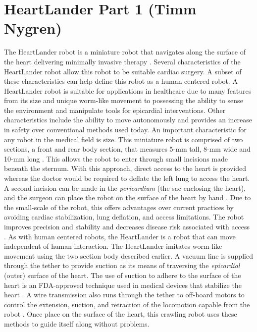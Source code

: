 \documentclass[11pt,conference]{IEEEtran}
\begin{document}
\section{ HeartLander Part 1 (Timm Nygren)}

\indent The HeartLander robot is a miniature robot that navigates along the surface of the heart delivering minimally invasive therapy \cite{overview}. Several characteristics of the HeartLander robot allow this robot to be suitable cardiac surgery. A subset of these characteristics can help define this robot as a human centered robot. A HeartLander robot is suitable for applications in healthcare due to many features from its size and unique worm-like movement to possessing the ability to sense the environment and manipulate tools for epicardial interventions. Other characteristics include the ability to move autonomously and provides an increase in safety over conventional methods used today.
\newline
\indent An important characteristic for any robot in the medical field is size. This  miniature robot is comprised of two sections, a front and rear body section, that measures 5-mm tall, 8-mm wide and 10-mm long \cite{design}. This allows the robot to enter through small incisions made beneath the sternum. With this approach, direct access to the heart is provided whereas the doctor would be required to deflate the left lung to access the heart. A second incision can be made in the \textit{pericardium} (the sac enclosing the heart), and the surgeon can place the robot on the surface of the heart by hand \cite{design}. Due to the small-scale of the robot, this offers advantages over current practices by avoiding cardiac stabilization, lung deflation, and access limitations. The robot improves precision and stability and decreases disease risk associated with access \cite{mellon}.
\newline
\indent As with human centered robots, the HeartLander is a robot that can move independent of human interaction. The HeartLander imitates worm-like movement using the two section body described earlier. A vacuum line is supplied through the tether to provide suction as its means of traversing the \textit{epicardial} (outer) surface of the heart. The use of suction to adhere to the surface of the heart is an FDA-approved technique used in medical devices that stabilize the heart \cite{design}. A wire transmission also runs through the tether to off-board motors to control the extension, suction, and retraction of the locomotion capable from the robot \cite{design}. Once place on the surface of the heart, this crawling robot uses these methods to guide itself along without problems.
\end{document}

